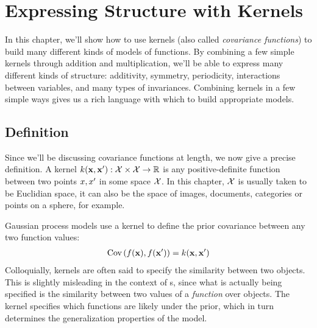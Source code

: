 
\inbpdocument

\chapter{Expressing Structure with Kernels}
\label{ch:kernels}

In this chapter, we'll show how to use kernels (also called \emph{covariance functions}) to build many different kinds of models of functions.
By combining a few simple kernels through addition and multiplication, we'll be able to express many different kinds of structure: additivity, symmetry, periodicity, interactions between variables, and many types of invariances.
Combining kernels in a few simple ways gives us a rich language with which to build appropriate models.


\section{Definition}

Since we'll be discussing covariance functions at length, we now give a precise definition.
A kernel $k({\bf{x}}, {\bf{x}}') : \mathcal{X} \times \mathcal{X} \to \mathbb{R}$ is any positive-definite function between two points $x, x'$ in some space $\mathcal{X}$.
In this chapter, $\mathcal{X}$ is usually taken to be Euclidian space, %
it can also be the space of images, documents, categories or points on a sphere, for example.

Gaussian process models use a kernel to define the prior covariance between any two function values:
%
\begin{align}
\textrm{Cov}\left(f({\bf{x}}), f({\bf{x}}') \right) = k({\bf{x}},{\bf{x}}')
\end{align}
%
Colloquially, kernels are often said to specify the similarity between two objects.
This is slightly misleading in the context of \gp{}s, since what is actually being specified is the similarity between two values of a \emph{function} over objects.
The kernel specifies which functions are likely under the \gp{} prior, which in turn determines the generalization properties of the model.


